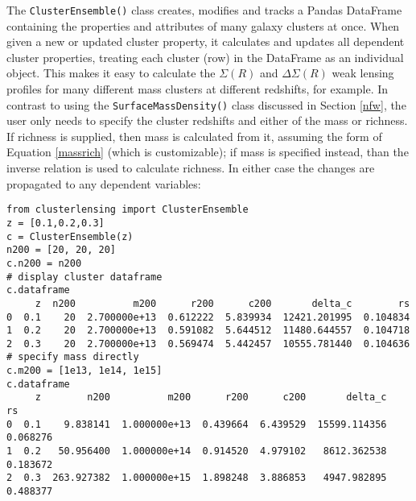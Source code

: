 \documentclass{emulateapj}
\newcommand{\code}{\lstinline[style=codeintext]}
\begin{document}
The \code{ClusterEnsemble()} class creates, modifies and tracks a Pandas DataFrame containing the properties and attributes of many galaxy clusters at once. When given a new or updated cluster property, it calculates and updates all dependent cluster properties, treating each cluster (row) in the DataFrame as an individual object. This makes it easy to calculate the $\Sigma(R)$ and $\Delta\Sigma(R)$ weak lensing profiles for many different mass clusters at different redshifts, for example. In contrast to using the \code{SurfaceMassDensity()} class discussed in Section \ref{nfw}, the user only needs to specify the cluster redshifts and either of the mass or richness. If richness is supplied, then mass is calculated from it, assuming the form of Equation \ref{massrich} (which is customizable); if mass is specified instead, than the inverse relation is used to calculate richness. In either case the changes are propagated to any dependent variables:
\begin{lstlisting}
from clusterlensing import ClusterEnsemble
z = [0.1,0.2,0.3]
c = ClusterEnsemble(z)
n200 = [20, 20, 20]
c.n200 = n200
# display cluster dataframe
c.dataframe
     z  n200          m200      r200      c200       delta_c        rs
0  0.1    20  2.700000e+13  0.612222  5.839934  12421.201995  0.104834
1  0.2    20  2.700000e+13  0.591082  5.644512  11480.644557  0.104718
2  0.3    20  2.700000e+13  0.569474  5.442457  10555.781440  0.104636
# specify mass directly
c.m200 = [1e13, 1e14, 1e15]
c.dataframe
     z        n200          m200      r200      c200       delta_c        rs
0  0.1    9.838141  1.000000e+13  0.439664  6.439529  15599.114356  0.068276
1  0.2   50.956400  1.000000e+14  0.914520  4.979102   8612.362538  0.183672
2  0.3  263.927382  1.000000e+15  1.898248  3.886853   4947.982895  0.488377
\end{lstlisting}
\end{document}
